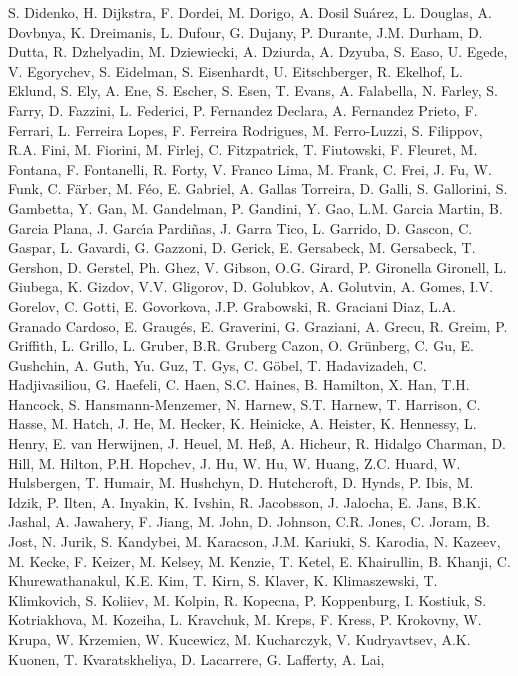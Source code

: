 S. Didenko,
H. Dijkstra,
F. Dordei,
M. Dorigo,
A. Dosil Su{\'a}rez,
L. Douglas,
A. Dovbnya,
K. Dreimanis,
L. Dufour,
G. Dujany,
P. Durante,
J.M. Durham,
D. Dutta,
R. Dzhelyadin,
M. Dziewiecki,
A. Dziurda,
A. Dzyuba,
S. Easo,
U. Egede,
V. Egorychev,
S. Eidelman,
S. Eisenhardt,
U. Eitschberger,
R. Ekelhof,
L. Eklund,
S. Ely,
A. Ene,
S. Escher,
S. Esen,
T. Evans,
A. Falabella,
N. Farley,
S. Farry,
D. Fazzini,
L. Federici,
P. Fernandez Declara,
A. Fernandez Prieto,
F. Ferrari,
L. Ferreira Lopes,
F. Ferreira Rodrigues,
M. Ferro-Luzzi,
S. Filippov,
R.A. Fini,
M. Fiorini,
M. Firlej,
C. Fitzpatrick,
T. Fiutowski,
F. Fleuret,
M. Fontana,
F. Fontanelli,
R. Forty,
V. Franco Lima,
M. Frank,
C. Frei,
J. Fu,
W. Funk,
C. F{\"a}rber,
M. F{\'e}o,
E. Gabriel,
A. Gallas Torreira,
D. Galli,
S. Gallorini,
S. Gambetta,
Y. Gan,
M. Gandelman,
P. Gandini,
Y. Gao,
L.M. Garcia Martin,
B. Garcia Plana,
J. Garc{\'\i}a Pardi{\~n}as,
J. Garra Tico,
L. Garrido,
D. Gascon,
C. Gaspar,
L. Gavardi,
G. Gazzoni,
D. Gerick,
E. Gersabeck,
M. Gersabeck,
T. Gershon,
D. Gerstel,
Ph. Ghez,
V. Gibson,
O.G. Girard,
P. Gironella Gironell,
L. Giubega,
K. Gizdov,
V.V. Gligorov,
D. Golubkov,
A. Golutvin,
A. Gomes,
I.V. Gorelov,
C. Gotti,
E. Govorkova,
J.P. Grabowski,
R. Graciani Diaz,
L.A. Granado Cardoso,
E. Graug{\'e}s,
E. Graverini,
G. Graziani,
A. Grecu,
R. Greim,
P. Griffith,
L. Grillo,
L. Gruber,
B.R. Gruberg Cazon,
O. Gr{\"u}nberg,
C. Gu,
E. Gushchin,
A. Guth,
Yu. Guz,
T. Gys,
C. G{\"o}bel,
T. Hadavizadeh,
C. Hadjivasiliou,
G. Haefeli,
C. Haen,
S.C. Haines,
B. Hamilton,
X. Han,
T.H. Hancock,
S. Hansmann-Menzemer,
N. Harnew,
S.T. Harnew,
T. Harrison,
C. Hasse,
M. Hatch,
J. He,
M. Hecker,
K. Heinicke,
A. Heister,
K. Hennessy,
L. Henry,
E. van Herwijnen,
J. Heuel,
M. He{\ss},
A. Hicheur,
R. Hidalgo Charman,
D. Hill,
M. Hilton,
P.H. Hopchev,
J. Hu,
W. Hu,
W. Huang,
Z.C. Huard,
W. Hulsbergen,
T. Humair,
M. Hushchyn,
D. Hutchcroft,
D. Hynds,
P. Ibis,
M. Idzik,
P. Ilten,
A. Inyakin,
K. Ivshin,
R. Jacobsson,
J. Jalocha,
E. Jans,
B.K. Jashal,
A. Jawahery,
F. Jiang,
M. John,
D. Johnson,
C.R. Jones,
C. Joram,
B. Jost,
N. Jurik,
S. Kandybei,
M. Karacson,
J.M. Kariuki,
S. Karodia,
N. Kazeev,
M. Kecke,
F. Keizer,
M. Kelsey,
M. Kenzie,
T. Ketel,
E. Khairullin,
B. Khanji,
C. Khurewathanakul,
K.E. Kim,
T. Kirn,
S. Klaver,
K. Klimaszewski,
T. Klimkovich,
S. Koliiev,
M. Kolpin,
R. Kopecna,
P. Koppenburg,
I. Kostiuk,
S. Kotriakhova,
M. Kozeiha,
L. Kravchuk,
M. Kreps,
F. Kress,
P. Krokovny,
W. Krupa,
W. Krzemien,
W. Kucewicz,
M. Kucharczyk,
V. Kudryavtsev,
A.K. Kuonen,
T. Kvaratskheliya,
D. Lacarrere,
G. Lafferty,
A. Lai,

